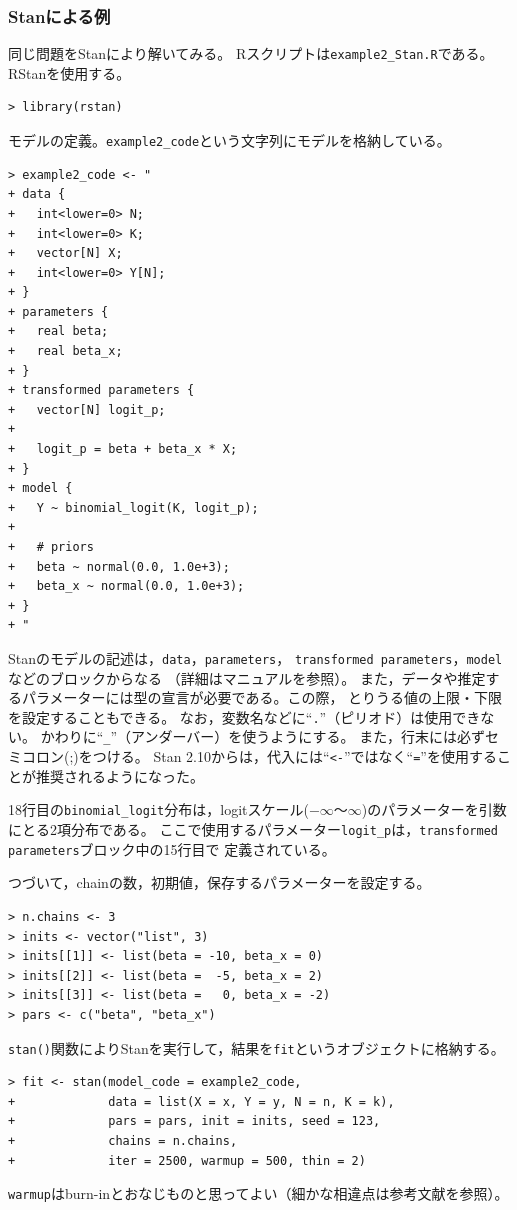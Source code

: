 \documentclass[11pt,uplatex]{jsarticle}
\begin{document}

\subsubsection{Stanによる例}
同じ問題を\textsf{Stan}により解いてみる。
\textsf{R}スクリプトは\texttt{example2\_Stan.R}である。
RStanを使用する。
%
\begin{lstlisting}
> library(rstan)
\end{lstlisting}

モデルの定義。\texttt{example2\_code}という文字列にモデルを格納している。
%
\begin{lstlisting}
> example2_code <- "
+ data {
+   int<lower=0> N;
+   int<lower=0> K;
+   vector[N] X;
+   int<lower=0> Y[N];
+ }
+ parameters {
+   real beta;
+   real beta_x;
+ }
+ transformed parameters {
+   vector[N] logit_p;
+ 
+   logit_p = beta + beta_x * X;
+ }
+ model {
+   Y ~ binomial_logit(K, logit_p);
+   
+   # priors
+   beta ~ normal(0.0, 1.0e+3);
+   beta_x ~ normal(0.0, 1.0e+3);
+ }
+ "
\end{lstlisting}
\noindent
Stanのモデルの記述は，\texttt{data}，\texttt{parameters}，
\texttt{transformed parameters}，\texttt{model}などのブロックからなる
（詳細はマニュアルを参照）。
また，データや推定するパラメーターには型の宣言が必要である。この際，
とりうる値の上限・下限を設定することもできる。
なお，変数名などに``\texttt{.}''（ピリオド）は使用できない。
かわりに``\texttt{\_}''（アンダーバー）を使うようにする。
また，行末には必ずセミコロン(;)をつける。
Stan 2.10からは，代入には``\texttt{<-}''ではなく``\texttt{=}''を使用することが推奨されるようになった。

18行目の\texttt{binomial\_logit}分布は，logitスケール($-\infty$〜$\infty$)のパラメーターを引数にとる2項分布である。
ここで使用するパラメーター\texttt{logit\_p}は，\texttt{transformed parameters}ブロック中の15行目で
定義されている。

つづいて，chainの数，初期値，保存するパラメーターを設定する。
\begin{lstlisting}
> n.chains <- 3
> inits <- vector("list", 3)
> inits[[1]] <- list(beta = -10, beta_x = 0)
> inits[[2]] <- list(beta =  -5, beta_x = 2)
> inits[[3]] <- list(beta =   0, beta_x = -2)
> pars <- c("beta", "beta_x")
\end{lstlisting}
\texttt{stan()}関数によりStanを実行して，結果を\texttt{fit}というオブジェクトに格納する。
\begin{lstlisting}
> fit <- stan(model_code = example2_code,
+             data = list(X = x, Y = y, N = n, K = k),
+             pars = pars, init = inits, seed = 123,
+             chains = n.chains,
+             iter = 2500, warmup = 500, thin = 2)
\end{lstlisting}
\noindent
\texttt{warmup}はburn-inとおなじものと思ってよい（細かな相違点は参考文献\cite{BDA3}を参照）。
\end{document}

